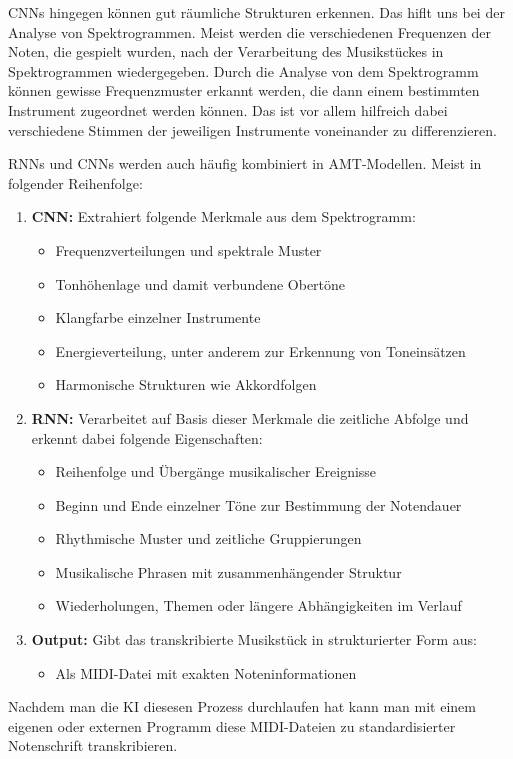 CNNs hingegen können gut räumliche Strukturen erkennen.
Das hiflt uns bei der Analyse von Spektrogrammen.
Meist werden die verschiedenen Frequenzen der Noten, die gespielt wurden,
nach der Verarbeitung des Musikstückes in Spektrogrammen wiedergegeben. %
Durch die Analyse von dem Spektrogramm können gewisse Frequenzmuster erkannt werden,
die dann einem bestimmten Instrument zugeordnet werden können.
Das ist vor allem hilfreich dabei verschiedene Stimmen der jeweiligen Instrumente voneinander zu differenzieren. %

RNNs und CNNs werden auch häufig kombiniert in AMT-Modellen.
Meist in folgender Reihenfolge:
\begin{enumerate}
    \item \textbf{CNN:} Extrahiert folgende Merkmale aus dem Spektrogramm:
    \begin{itemize}
        \item Frequenzverteilungen und spektrale Muster
        \item Tonhöhenlage und damit verbundene Obertöne
        \item Klangfarbe einzelner Instrumente
        \item Energieverteilung, unter anderem zur Erkennung von Toneinsätzen
        \item Harmonische Strukturen wie Akkordfolgen
    \end{itemize}

    \item \textbf{RNN:} Verarbeitet auf Basis dieser Merkmale die zeitliche Abfolge und erkennt dabei folgende Eigenschaften:
    \begin{itemize}
        \item Reihenfolge und Übergänge musikalischer Ereignisse
        \item Beginn und Ende einzelner Töne zur Bestimmung der Notendauer
        \item Rhythmische Muster und zeitliche Gruppierungen
        \item Musikalische Phrasen mit zusammenhängender Struktur
        \item Wiederholungen, Themen oder längere Abhängigkeiten im Verlauf
    \end{itemize}

    \item \textbf{Output:} Gibt das transkribierte Musikstück in strukturierter Form aus:
    \begin{itemize}
        \item Als MIDI-Datei mit exakten Noteninformationen
    \end{itemize}
\end{enumerate}
Nachdem man die KI diesesen Prozess durchlaufen hat kann man mit einem eigenen oder externen Programm
diese MIDI-Dateien zu standardisierter Notenschrift transkribieren.

